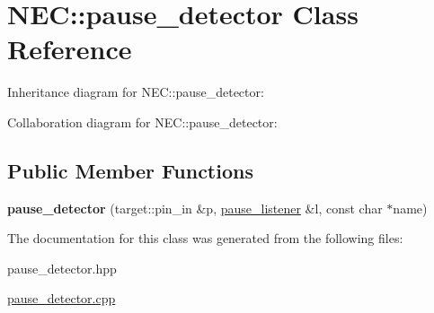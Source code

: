 \hypertarget{classNEC_1_1pause__detector}{}\section{N\+EC\+:\+:pause\+\_\+detector Class Reference}
\label{classNEC_1_1pause__detector}


Inheritance diagram for N\+EC\+:\+:pause\+\_\+detector\+:


Collaboration diagram for N\+EC\+:\+:pause\+\_\+detector\+:
\subsection*{Public Member Functions}
\begin{DoxyCompactItemize}
\item 
\mbox{\label{classNEC_1_1pause__detector_a03f47d3692d2fd7f543a9c185beb1613}} 
{\bfseries pause\+\_\+detector} (target\+::pin\+\_\+in \&p, \hyperlink{classNEC_1_1pause__listener}{pause\+\_\+listener} \&l, const char $\ast$name)
\end{DoxyCompactItemize}


The documentation for this class was generated from the following files\+:\begin{DoxyCompactItemize}
\item 
pause\+\_\+detector.\+hpp\item 
\hyperlink{pause__detector_8cpp}{pause\+\_\+detector.\+cpp}\end{DoxyCompactItemize}
